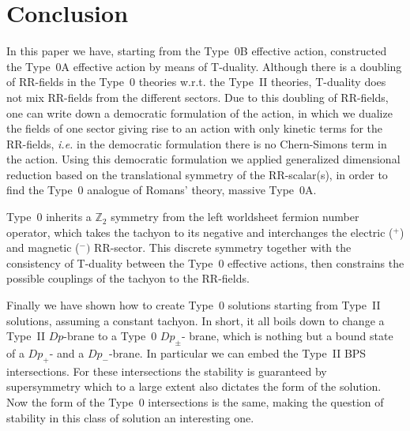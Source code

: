 \documentclass[12pt,a4paper]{article}
\begin{document}
\section{Conclusion}
%
In this paper we have, starting from the Type~0B effective action,
constructed the Type~0A effective action by means of T-duality.
Although there is a doubling of RR-fields in the Type~0 theories
w.r.t.  the Type~II theories, T-duality does not mix RR-fields from
the different sectors.  Due to this doubling of RR-fields, one can
write down a democratic formulation of the action, in which we dualize
the fields of one sector giving rise to an action with only kinetic
terms for the RR-fields, {\em i.e.} in the democratic formulation
there is no Chern-Simons term in the action. Using this democratic
formulation we applied generalized dimensional reduction based on the
translational symmetry of the RR-scalar(s), in order to find the
Type~0 analogue of Romans' theory, massive Type~0A.
\par
Type~0 inherits a $\mathbb{Z}_{2}$ symmetry from the left worldsheet
fermion number operator, which takes the tachyon to its negative and
interchanges the electric ($^{+}$) and magnetic ($^{-})$ RR-sector.
This discrete symmetry together with the consistency of T-duality
between the Type~0 effective actions, then constrains the possible
couplings of the tachyon to the RR-fields.
\par
Finally we have shown how to create Type~0 solutions starting from
Type~II solutions, assuming a constant tachyon. In short, it all boils
down to change a Type~II $Dp$-brane to a Type~0 $Dp_{\pm}$- brane,
which is nothing but a bound state of a $Dp_{+}$- and a
$Dp_{-}$-brane. In particular we can embed the Type~II BPS
intersections.  For these intersections the stability is guaranteed by
supersymmetry which to a large extent also dictates the form of the
solution.  Now the form of the Type~0 intersections is the same,
making the question of stability in this class of solution an
interesting one.
\end{document}
